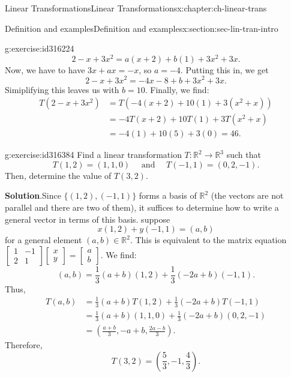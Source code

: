 \documentclass[oneside,10pt,]{book}
\numberwithin{equation}{section}
\newcommand{\bbm}{\begin{bmatrix}}
\newcommand{\ebm}{\end{bmatrix}}
\newcommand{\R}{\mathbb{R}}
\newcommand{\amp}{&}
\begin{document}
\begin{chapterptx}{Linear Transformations}{}{Linear Transformations}{}{}{x:chapter:ch-linear-trans}
\begin{sectionptx}{Definition and examples}{}{Definition and examples}{}{}{x:section:sec-lin-tran-intro}
\begin{inlineexercise}{}{g:exercise:id316224}
\begin{equation*}
2-x+3x^2=a(x+2)+b(1)+3x^2+3x\text{.}
\end{equation*}
Now, we have to have \(3x+ax=-x\), so \(a=-4\). Putting this in, we get%
\begin{equation*}
2-x+3x^2=-4x-8+b+3x^2+3x\text{.}
\end{equation*}
Simiplifying this leaves us with \(b=10\). Finally, we find:%
\begin{align*}
T(2-x+3x^2) \amp = T(-4(x+2)+10(1)+3(x^2+x)) \\
\amp = -4T(x+2)+10T(1)+3T(x^2+x)\\
\amp = -4(1)+10(5)+3(0) = 46\text{.}
\end{align*}
%
\end{inlineexercise}
\begin{inlineexercise}{}{g:exercise:id316384}%
Find a linear transformation \(T:\R^2\to \R^3\) such that%
\begin{equation*}
T(1,2)=(1,1,0) \quad \text{ and } \quad T(-1,1) = (0,2,-1)\text{.}
\end{equation*}
Then, determine the value of \(T(3,2)\).%
\par\smallskip%
\noindent\textbf{Solution}.\hypertarget{g:solution:id312615}{}\quad{}Since \(\{(1,2),(-1,1)\}\) forms a basis of \(\R^2\) (the vectors are not parallel and there are two of them), it suffices to determine how to write a general vector in terms of this basis. suppose%
\begin{equation*}
x(1,2)+y(-1,1)=(a,b)
\end{equation*}
for a general element \((a,b)\in \R^2\). This is equivalent to the matrix equation \(\bbm 1\amp -1\\2\amp 1\ebm\bbm x\\y\ebm = \bbm a\\b\ebm\). We find:%
\begin{equation*}
(a,b) = \frac13(a+b)(1,2)+\frac13(-2a+b)(-1,1).
\end{equation*}
Thus,%
\begin{align*}
T(a,b) \amp = \frac13(a+b)T(1,2)+\frac13(-2a+b)T(-1,1) \\
\amp = \frac13(a+b)(1,1,0)+\frac13(-2a+b)(0,2,-1)\\
\amp = \left(\frac{a+b}{3}, -a+b, \frac{2a-b}{3}\right)\text{.}
\end{align*}
Therefore,%
\begin{equation*}
T(3,2) = \left(\frac53, -1, \frac43\right)\text{.}
\end{equation*}
%
\end{inlineexercise}

\end{sectionptx}
\end{chapterptx}
\end{document}
